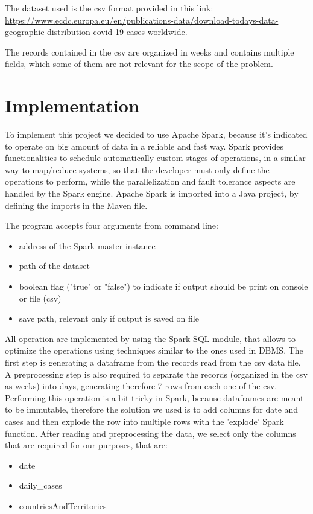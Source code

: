 \documentclass[10pt]{article}
\begin{document}
	The dataset used is the csv format provided in this link:\\
	\url{https://www.ecdc.europa.eu/en/publications-data/download-todays-data-geographic-distribution-covid-19-cases-worldwide}.
	
	The records contained in the csv are organized in weeks and contains multiple fields, which some of them are not relevant for the scope of the problem.
	
	\section{Implementation}
	To implement this project we decided to use Apache Spark, because it's indicated to operate on big amount of data in a reliable and fast way. Spark provides functionalities to schedule automatically custom stages of operations, in a similar way to map/reduce systems, so that the developer must only define the operations to perform, while the parallelization and fault tolerance aspects are handled by the Spark engine. Apache Spark is imported into a Java project, by defining the imports in the Maven file.
	
	The program accepts four arguments from command line:
	\begin{itemize}
		\item address of the Spark master instance
		\item path of the dataset
		\item boolean flag ("true" or "false") to indicate if output should be print on console or file (csv)
		\item save path, relevant only if output is saved on file
	\end{itemize}
	
	All operation are implemented by using the Spark SQL module, that allows to optimize the operations using techniques similar to the ones used in DBMS. The first step is generating a dataframe from the records read from the csv data file. A preprocessing step is also required to separate the records (organized in the csv as weeks) into days, generating therefore 7 rows from each one of the csv. Performing this operation is a bit tricky in Spark, because dataframes are meant to be immutable, therefore the solution we used is to add columns for date and cases and then explode the row into multiple rows with the 'explode' Spark function. After reading and preprocessing the data, we select only the columns that are required for our purposes, that are:
	\begin{itemize}
		\item date
		\item daily\_cases
		\item countriesAndTerritories
	\end{itemize}
	
\end{document}
